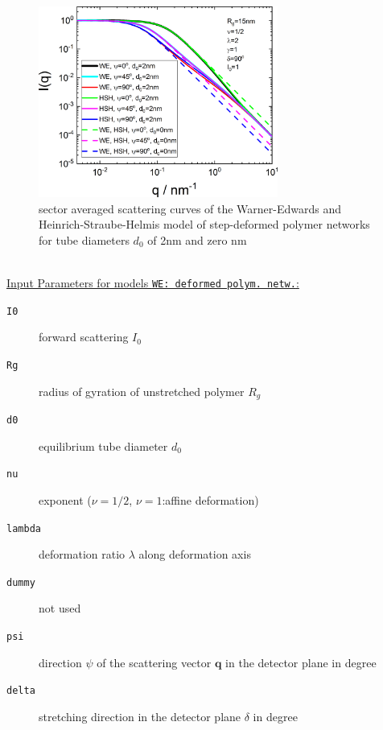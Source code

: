 \begin{figure}[htb]
\begin{center}
\includegraphics[width=0.7\textwidth]{../images/form_factor/deformed_sheared/deformed_polymer_network_I(sector).png}
\end{center}
\caption{sector averaged scattering curves of the Warner-Edwards and Heinrich-Straube-Helmis model of step-deformed polymer networks for tube diameters $d_0$ of 2nm and zero nm}
\label{fig:I(sector)polymernetwork}
\end{figure}

\hspace{1pt}\\
\uline{Input Parameters for models \texttt{WE: deformed polym. netw.}:}\\
\begin{description}
\item[\texttt{I0}] forward scattering $I_0$
\item[\texttt{Rg}] radius of gyration of unstretched polymer $R_g$
\item[\texttt{d0}] equilibrium tube diameter $d_0$
\item[\texttt{nu}] exponent ($\nu=1/2$, $\nu=1$:affine deformation)
\item[\texttt{lambda}] deformation ratio $\lambda$ along deformation axis
\item[\texttt{dummy}] not used
\item[\texttt{psi}] direction $\psi$ of the scattering vector $\mathbf{q}$ in the detector plane in degree
\item[\texttt{delta}] stretching direction in the detector plane $\delta$ in degree
\end{description}


